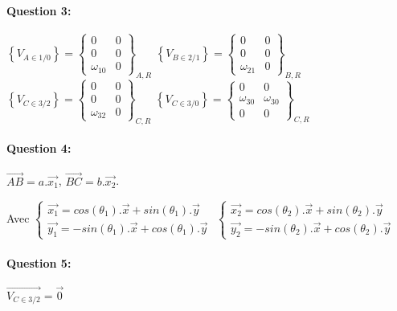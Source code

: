 \paragraph{Question 3:}
$\left\{V_{A\in 1/0}\right\}=
\left\{\begin{array}{cc}
0 & 0 \\
0 & 0 \\
\omega_{10} & 0
\end{array}\right\}_{A,R}$
$\left\{V_{B\in 2/1}\right\}=
\left\{\begin{array}{cc}
0 & 0 \\
0 & 0 \\
\omega_{21} & 0
\end{array}\right\}_{B,R}$
$\left\{V_{C\in 3/2}\right\}=
\left\{\begin{array}{cc}
0 & 0 \\
0 & 0 \\
\omega_{32} & 0
\end{array}\right\}_{C,R}$
$\left\{V_{C\in 3/0}\right\}=
\left\{\begin{array}{cc}
0 & 0 \\
\omega_{30} & \omega_{30} \\
0 & 0
\end{array}\right\}_{C,R}$

\paragraph{Question 4:} $\overrightarrow{AB}=a.\overrightarrow{x_1}$, $\overrightarrow{BC}=b.\overrightarrow{x_2}$.

Avec $\left\{\begin{array}{l} \overrightarrow{x_1}=cos(\theta_1).\overrightarrow{x}+sin(\theta_1).\overrightarrow{y} \\ \overrightarrow{y_1}=-sin(\theta_1).\overrightarrow{x}+cos(\theta_1).\overrightarrow{y}\end{array}\right.$
$\left\{\begin{array}{l} \overrightarrow{x_2}=cos(\theta_2).\overrightarrow{x}+sin(\theta_2).\overrightarrow{y} \\ \overrightarrow{y_2}=-sin(\theta_2).\overrightarrow{x}+cos(\theta_2).\overrightarrow{y}\end{array}\right.$

\paragraph{Question 5:} $\overrightarrow{V_{C\in 3/2}}=\overrightarrow{0}$

